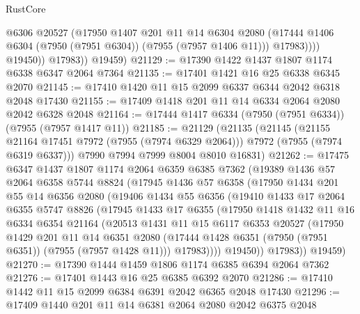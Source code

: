 \begin{lexlean}{RustCore}
\begin{coremodule}
                    @6306
                    @20527
                    (@17950
                      @1407
                      @201
                      @11
                      @14
                      @6304
                      @2080
                      (@17444 @1406 @6304 (@7950 (@7951 @6304)) (@7955 (@7957 @1406 @11)))
                      @17983))))
              @19450))
          @17983))
      @19459)
@21129 := @17390 @1422 @1437 @1807 @1174 @6338 @6347 @2064 @7364
@21135 := @17401 @1421 @16 @25 @6338 @6345 @2070
@21145 := @17410 @1420 @11 @15 @2099 @6337 @6344 @2042 @6318 @2048 @17430
@21155 := @17409 @1418 @201 @11 @14 @6334 @2064 @2080 @2042 @6328 @2048
@21164 := @17444 @1417 @6334 (@7950 (@7951 @6334)) (@7955 (@7957 @1417 @11))
@21185 := @21129
    (@21135
      (@21145
        (@21155 @21164 @17451 @7972 (@7955 (@7974 @6329 @2064)))
        @7972
        (@7955 (@7974 @6319 @6337)))
      @7990
      @7994
      @7999
      @8004
      @8010
      @16831)
@21262 := @17475
    @6347
    @1437
    @1807
    @1174
    @2064
    @6359
    @6385
    @7362
    (@19389
      @1436
      @57
      @2064
      @6358
      @5744
      @8824
      (@17945
        @1436
        @57
        @6358
        (@17950
          @1434
          @201
          @55
          @14
          @6356
          @2080
          (@19406
            @1434
            @55
            @6356
            (@19410
              @1433
              @17
              @2064
              @6355
              @5747
              @8826
              (@17945
                @1433
                @17
                @6355
                (@17950
                  @1418
                  @1432
                  @11
                  @16
                  @6334
                  @6354
                  @21164
                  (@20513
                    @1431
                    @11
                    @15
                    @6117
                    @6353
                    @20527
                    (@17950
                      @1429
                      @201
                      @11
                      @14
                      @6351
                      @2080
                      (@17444 @1428 @6351 (@7950 (@7951 @6351)) (@7955 (@7957 @1428 @11)))
                      @17983))))
              @19450))
          @17983))
      @19459)
@21270 := @17390 @1444 @1459 @1806 @1174 @6385 @6394 @2064 @7362
@21276 := @17401 @1443 @16 @25 @6385 @6392 @2070
@21286 := @17410 @1442 @11 @15 @2099 @6384 @6391 @2042 @6365 @2048 @17430
@21296 := @17409 @1440 @201 @11 @14 @6381 @2064 @2080 @2042 @6375 @2048

\end{coremodule}
\end{lexlean}
